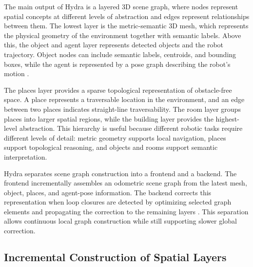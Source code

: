 {\small

The main output of Hydra is a layered 3D scene graph, where nodes represent spatial concepts at different levels of abstraction and edges represent relationships between them. The lowest layer is the metric-semantic 3D mesh, which represents the physical geometry of the environment together with semantic labels. Above this, the object and agent layer represents detected objects and the robot trajectory. Object nodes can include semantic labels, centroids, and bounding boxes, while the agent is represented by a pose graph describing the robot's motion \cite{hughes2022hydra}.

The places layer provides a sparse topological representation of obstacle-free space. A place represents a traversable location in the environment, and an edge between two places indicates straight-line traversability. The room layer groups places into larger spatial regions, while the building layer provides the highest-level abstraction. This hierarchy is useful because different robotic tasks require different levels of detail: metric geometry supports local navigation, places support topological reasoning, and objects and rooms support semantic interpretation.

Hydra separates scene graph construction into a frontend and a backend. The frontend incrementally assembles an odometric scene graph from the latest mesh, object, places, and agent-pose information. The backend corrects this representation when loop closures are detected by optimizing selected graph elements and propagating the correction to the remaining layers \cite{hughes2022hydra}. This separation allows continuous local graph construction while still supporting slower global correction.

}

\subsection{Incremental Construction of Spatial Layers}

